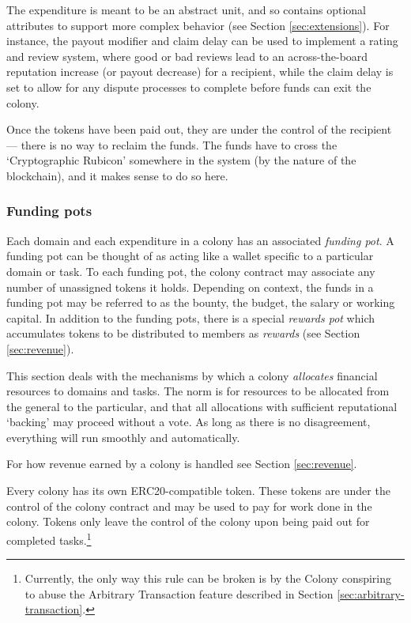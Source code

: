 The expenditure is meant to be an abstract unit, and so contains optional attributes to support more complex behavior (see Section \ref{sec:extensions}). For instance, the payout modifier and claim delay can be used to implement a rating and review system, where good or bad reviews lead to an across-the-board reputation increase (or payout decrease) for a recipient, while the claim delay is set to allow for any dispute processes to complete before funds can exit the colony.

Once the tokens have been paid out, they are under the control of the recipient --- there is no way to reclaim the funds. The funds have to cross the `Cryptographic Rubicon' somewhere in the system (by the nature of the blockchain), and it makes sense to do so here.

\subsubsection{Funding pots}

Each domain and each expenditure in a colony has an associated \emph{funding pot}. A funding pot can be thought of as acting like a wallet specific to a particular domain or task. To each funding pot, the colony contract may associate any number of unassigned tokens it holds. Depending on context, the funds in a funding pot may be referred to as the bounty, the budget, the salary or working capital. In addition to the funding pots, there is a special \emph{rewards pot} which accumulates tokens to be distributed to members as \textit{rewards} (see Section \ref{sec:revenue}).

This section deals with the mechanisms by which a colony \emph{allocates} financial resources to domains and tasks. The norm is for resources to be allocated from the general to the particular, and that all allocations with sufficient reputational `backing' may proceed without a vote. As long as there is no disagreement, everything will run smoothly and automatically.

For how revenue earned by a colony is handled see Section \ref{sec:revenue}.

Every colony has its own ERC20-compatible token. These tokens are under the control of the colony contract and may be used to pay for work done in the colony. Tokens only leave the control of the colony upon being paid out for completed tasks.\footnote{Currently, the only way this rule can be broken is by the Colony conspiring to abuse the Arbitrary Transaction feature described in Section \ref{sec:arbitrary-transaction}. }

